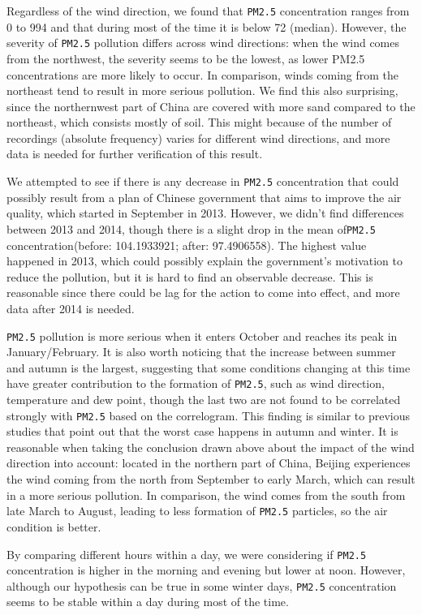 \documentclass[]{article}
\begin{document}
Regardless of the wind direction, we found that \texttt{PM2.5}
concentration ranges from 0 to 994 and that during most of the time it
is below 72 (median). However, the severity of \texttt{PM2.5} pollution
differs across wind directions: when the wind comes from the northwest,
the severity seems to be the lowest, as lower PM2.5 concentrations are
more likely to occur. In comparison, winds coming from the northeast
tend to result in more serious pollution. We find this also surprising,
since the northernwest part of China are covered with more sand compared
to the northeast, which consists mostly of soil. This might because of
the number of recordings (absolute frequency) varies for different wind
directions, and more data is needed for further verification of this
result.

We attempted to see if there is any decrease in \texttt{PM2.5}
concentration that could possibly result from a plan of Chinese
government that aims to improve the air quality, which started in
September in 2013. However, we didn't find differences between 2013 and
2014, though there is a slight drop in the mean of\texttt{PM2.5}
concentration(before: 104.1933921; after: 97.4906558). The highest value
happened in 2013, which could possibly explain the government's
motivation to reduce the pollution, but it is hard to find an observable
decrease. This is reasonable since there could be lag for the action to
come into effect, and more data after 2014 is needed.

\texttt{PM2.5} pollution is more serious when it enters October and
reaches its peak in January/February. It is also worth noticing that the
increase between summer and autumn is the largest, suggesting that some
conditions changing at this time have greater contribution to the
formation of \texttt{PM2.5}, such as wind direction, temperature and dew
point, though the last two are not found to be correlated strongly with
\texttt{PM2.5} based on the correlogram. This finding is similar to
previous studies that point out that the worst case happens in autumn
and winter. It is reasonable when taking the conclusion drawn above
about the impact of the wind direction into account: located in the
northern part of China, Beijing experiences the wind coming from the
north from September to early March, which can result in a more serious
pollution. In comparison, the wind comes from the south from late March
to August, leading to less formation of \texttt{PM2.5} particles, so the
air condition is better.

By comparing different hours within a day, we were considering if
\texttt{PM2.5} concentration is higher in the morning and evening but
lower at noon. However, although our hypothesis can be true in some
winter days, \texttt{PM2.5} concentration seems to be stable within a
day during most of the time.
\end{document}
